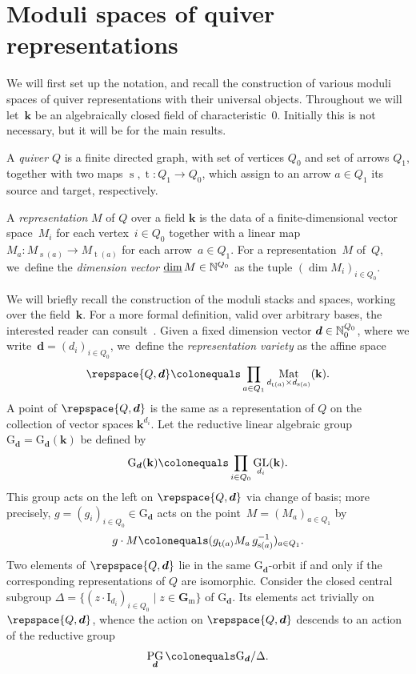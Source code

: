 \documentclass[JEP,XML,SOM,Unicode,NoEqCountersInSection,published]{cedram}
\theoremstyle{plain}
\theoremstyle{definition}
\DeclareMathOperator\dimvect{\underline{\operatorname{dim}}}
\DeclareMathOperator\GL{GL}
\DeclareMathOperator\Mat{Mat}
\DeclareMathOperator\PG{PG}
\DeclareMathOperator\source{s}
\DeclareMathOperator\target{t}
\newcommand\field{\mathbf{k}}
\newcommand\Gm{\ensuremath{\mathbf{G}_{\mathrm{m}}}}
\newcommand\group[1][\tuple{d}]{\mathrm{G}_{#1}}
\newcommand\tuple[1]{\ensuremath{{\boldsymbol{#1}}}}
\begin{document}
\section{Moduli spaces of quiver representations}
\label{section:moduli}

We will first set up the notation,
and recall the construction of various moduli spaces of quiver representations
with their universal objects.
Throughout we will let~$\field$ be an algebraically closed field of characteristic~0.
Initially this is not necessary, but it will be for the main results.

A \emph{quiver} $Q$ is a finite directed graph,
with set of vertices $Q_0$ and set of arrows $Q_1$,
together with two maps $\source, \target\colon Q_1 \to Q_0$,
which assign to an arrow $a \in Q_1$ its source and target, respectively.

A \emph{representation} $M$ of $Q$ over a field $\field$
is the data of a finite-dimensional vector space~$M_i$
for each vertex~$i \in Q_0$
together with a linear map~$M_a\colon M_{\source(a)} \to M_{\target(a)}$
for each arrow~$a \in Q_1$.
For a representation~$M$ of~$Q$, we~define the \emph{dimension vector} $\dimvect M \in \smash{\mathbb{N}^{Q_0}}$ as the tuple $(\dim M_i)_{i \in Q_0}$.

We will briefly recall the construction of the moduli stacks and spaces,
working over the field~$\field$.
For a more formal definition,
valid over arbitrary bases,
the interested reader can consult~\cite[\S3]{2210.00033v1}.
Given a fixed dimension vector $\tuple{d} \in \smash{\mathbb{N}_0^{Q_0}}$,
where we write~$\tuple{d}=(d_i)_{i\in Q_0}$, we~define the \emph{representation variety}
as the affine space
\begin{equation}
\label{equation:representation-variety}
\repspace{Q,\tuple{d}}\colonequals \prod_{a \in Q_1} \Mat_{d_{\target(a)} \times d_{\source(a)}}(\field).
\end{equation}
A point of $\repspace{Q,\tuple{d}}$ is the same as a representation of $Q$ on the collection of vector spaces $\field^{d_i}$.
Let the reductive linear algebraic group $\group=\group(\field)$ be defined by
\begin{equation*}
\group(\field)\colonequals \prod_{i \in Q_0} \GL_{d_i}(\field).
\end{equation*}
This group acts on the left on $\repspace{Q,\tuple{d}}$ via change of basis;
more precisely,
$g = (g_i)_{i \in Q_0}\in\group$ acts on the point~$M = (M_a)_{a \in Q_1}$ by
\begin{equation*}
g\cdot M \colonequals (g_{\target(a)}M_a\,g_{\source(a)}^{-1})_{a \in Q_1}.
\end{equation*}
Two elements of $\repspace{Q,\tuple{d}}$ lie in the same $\group$-orbit
if and only if the corresponding representations of $Q$ are isomorphic.
Consider the closed central subgroup \hbox{$\Delta = \{(z\cdot \mathrm{I}_{d_i})_{i \in Q_0} \mid z \in \Gm\}$} of $\group$.
Its elements act trivially on $\repspace{Q,\tuple{d}}$,
whence the action on $\repspace{Q,\tuple{d}}$ descends to an action of the reductive group
\begin{equation*}
\PG_{\tuple{d}} \colonequals \group/\Delta.
\end{equation*}
\end{document}
